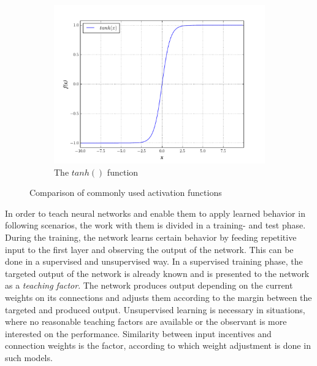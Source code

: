 \documentclass[10pt,a4paper,DIV=11]{scrreprt}
\begin{document}
\begin{figure}[H]
\begin{subfigure}{.5\textwidth}
  \centering
  \includegraphics[width=\linewidth]{files/activation/tanh.pdf}
  \caption{The $tanh()$ function}
  \label{fig:plot3}
\end{subfigure}
\caption{Comparison of commonly used activation functions}
\label{fig:activations}
\end{figure}

In order to teach neural networks and enable them to apply learned behavior in following scenarios, the work with them is divided in a training- and test phase. During the 
training, the network learns certain behavior by feeding repetitive input to the first layer and observing the output of the network. This can be done in a supervised and 
unsupervised way. In a supervised training phase, the targeted output of the network is already known and is presented to the network as a \textit{teaching factor}. The network 
produces output depending on the current weights on its connections and adjusts them according to the margin between the targeted and produced output. Unsupervised learning is 
necessary in situations, where no reasonable teaching factors are available or the observant is more interested on the performance. Similarity between input incentives and 
connection weights is the factor, according to which weight adjustment is done in such models.
\end{document}
